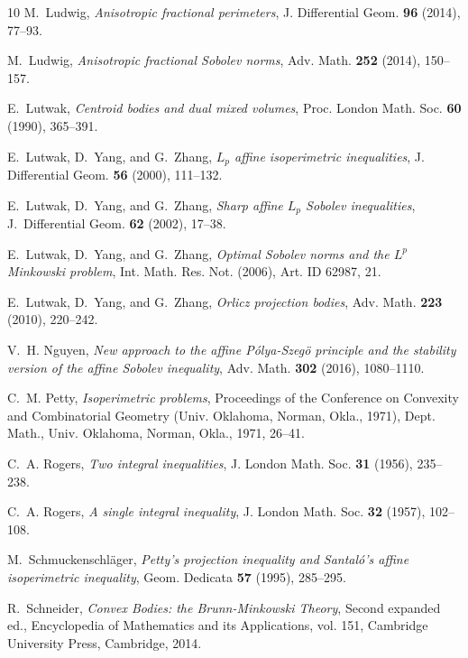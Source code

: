 \documentclass{amsart}
\begin{document}
\begin{thebibliography}{10}
M.~Ludwig, {\em Anisotropic fractional perimeters}, J. Differential Geom.
\textbf{96} (2014), 77--93.

M.~Ludwig, {\em Anisotropic fractional Sobolev norms}, Adv. Math. \textbf{252}
(2014), 150--157.

E.~Lutwak, {\em Centroid bodies and dual mixed volumes}, Proc. London Math.
Soc. \textbf{60} (1990), 365--391.

E.~Lutwak, D.~Yang, and G.~Zhang, {\em ${L}_p$ affine isoperimetric
inequalities}, J. Differential Geom. \textbf{56} (2000), 111--132.

E.~Lutwak, D.~Yang, and G.~Zhang, {\em Sharp affine ${L}_{p}$ Sobolev
inequalities}, J.~Differential Geom. \textbf{62} (2002), 17--38.

E.~Lutwak, D.~Yang, and G.~Zhang, {\em Optimal Sobolev norms and the
$L^p$ Minkowski problem}, Int. Math. Res. Not. (2006), Art. ID 62987,
21.

E.~Lutwak, D.~Yang, and G.~Zhang, {\em Orlicz projection bodies}, Adv.
Math. \textbf{223} (2010), 220--242.

V.~H. Nguyen, {\em New approach to the affine P\'{o}lya-Szeg\"{o} principle
and the stability version of the affine Sobolev inequality}, Adv. Math.
\textbf{302} (2016), 1080--1110.

C.~M. Petty, {\em Isoperimetric problems}, Proceedings of the Conference
on Convexity and Combinatorial Geometry (Univ. Oklahoma, Norman,
Okla., 1971), Dept. Math., Univ. Oklahoma, Norman, Okla., 1971, 26--41.

C.~A. Rogers, {\em Two integral inequalities}, J. London Math. Soc. \textbf{31}
(1956), 235--238.

C.~A. Rogers, {\em A single integral inequality}, J. London Math. Soc.
\textbf{32} (1957), 102--108.

M.~Schmuckenschl\"ager, {\em Petty's projection inequality and Santal\'o's
affine isoperimetric inequality}, Geom. Dedicata \textbf{57} (1995), 285--295.

R.~Schneider, {\em Convex Bodies: the Brunn-Minkowski Theory},
Second expanded ed., Encyclopedia of Mathe\-matics and its Applications,
vol. 151, Cambridge University Press, Cambridge, 2014.


\end{thebibliography}
\end{document}
